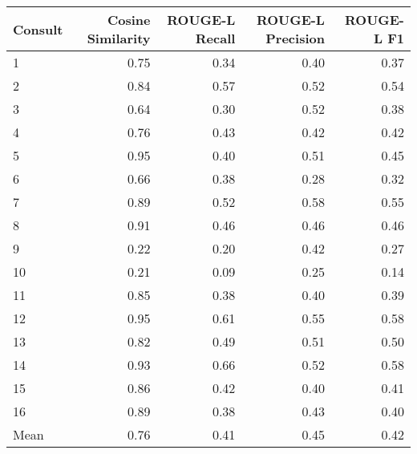 \begin{tabular}{lrrrr}
\toprule
Consult & Cosine Similarity & ROUGE-L Recall & ROUGE-L Precision & ROUGE-L F1 \\
\midrule
1 & 0.75 & 0.34 & 0.40 & 0.37 \\
2 & 0.84 & 0.57 & 0.52 & 0.54 \\
3 & 0.64 & 0.30 & 0.52 & 0.38 \\
4 & 0.76 & 0.43 & 0.42 & 0.42 \\
5 & 0.95 & 0.40 & 0.51 & 0.45 \\
6 & 0.66 & 0.38 & 0.28 & 0.32 \\
7 & 0.89 & 0.52 & 0.58 & 0.55 \\
8 & 0.91 & 0.46 & 0.46 & 0.46 \\
9 & 0.22 & 0.20 & 0.42 & 0.27 \\
10 & 0.21 & 0.09 & 0.25 & 0.14 \\
11 & 0.85 & 0.38 & 0.40 & 0.39 \\
12 & 0.95 & 0.61 & 0.55 & 0.58 \\
13 & 0.82 & 0.49 & 0.51 & 0.50 \\
14 & 0.93 & 0.66 & 0.52 & 0.58 \\
15 & 0.86 & 0.42 & 0.40 & 0.41 \\
16 & 0.89 & 0.38 & 0.43 & 0.40 \\
Mean & 0.76 & 0.41 & 0.45 & 0.42 \\
\bottomrule
\end{tabular}
